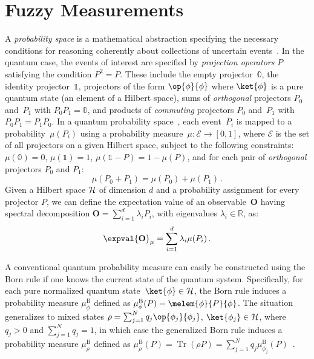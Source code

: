 \documentclass[english,reprint, aps, prl,superscriptaddress, showpacs,
showkeys, longbibliography, amsmath, amssymb, floatfix]{revtex4-1}
\theoremstyle{plain}
\theoremstyle{definition}
\newcommand{\events}{\ensuremath{\mathcal{E}}}
\newcommand{\proj}[1]{\op{#1}{#1}}
\newcommand{\Tr}{\ensuremath{\mathop{\mathrm{Tr}}\nolimits}}
\begin{document}
\section{Fuzzy Measurements}
\label{sec:fuzzy}

A \emph{probability space} is a mathematical abstraction specifying
the necessary conditions for reasoning coherently about collections of
uncertain
events~\cite{Kolmogorov1950,544199,Griffiths2003,Grabisch2016}. In the
quantum case, the events of interest are specified by \emph{projection
  operators} $P$ satisfying the condition $P^2=P$. These include the
empty projector~$\mathbb{0}$, the identity projector~$\mathbb{1}$,
projectors of the form $\proj{\phi}$ where $\ket{\phi}$ is a pure
quantum state (an element of a Hilbert space), sums of
\emph{orthogonal} projectors $P_0$ and~$P_1$ with $P_0P_1=\mathbb{0}$,
and products of \emph{commuting} projectors $P_0$ and~$P_1$ with
$P_0P_1=P_1P_0$. In a quantum probability
space~\cite{10.2307/2308516,gleason1957,Redhead1987-REDINA,Maassen2010},
each event~$P_{i}$ is mapped to a probability~$\mu(P_{i})$ using a
probability measure~$\mu:\events\rightarrow[0,1]$, where $\events$ is
the set of all projectors on a given Hilbert space, subject to the
following constraints: $\mu(\mathbb{0})=0$, $\mu(\mathbb{1})=1$,
$\mu\left(\mathbb{1}-P\right)=1-\mu\left(P\right)$, and for each pair
of \emph{orthogonal} projectors $P_{0}$ and $P_{1}$:
\begin{equation}
{\mu}\left(P_{0}+P_{1}\right)={\mu}\left(P_{0}\right)+{\mu}\left(P_{1}\right)\,.\label{eq:QuantumProbability-Addition}
\end{equation}
Given a Hilbert space ${\cal H}$ of dimension $d$ and a probability assignment
for every projector $P$, we can define the expectation value of an
observable~$\mathbf{O}$ having spectral decomposition
$\mathbf{O}=\sum_{i=1}^{d}\lambda_{i}P_{i}$, with eigenvalues $\lambda_i \in \mathbb{R}$, as:
\begin{equation}
\expval{\mathbf{O}}_{\mu}=\sum_{i=1}^{d}\lambda_{i}\mu(P_{i})\,.\label{eq:quantum-expectation}
\end{equation}

A conventional quantum probability measure can easily be constructed
using the Born rule if one knows the current state of the quantum
system.  Specifically, for each pure normalized quantum
state~$\ket{\phi} \in {\cal H}$, the Born rule induces a probability measure
$\mu_{\phi}^{\mathrm{B}}$ defined as
$\mu_{\phi}^{\mathrm{B}}(P)=\melem{\phi}{P}{\phi}$. The situation
generalizes to mixed states
$\rho = \sum_{j=1}^{N}q_{j}\proj{\phi_{j}}$, $\ket{\phi_j} \in {\cal H}$, where $q_j > 0$ and
$\sum_{j=1}^{N}q_{j}=1$, in which case the generalized Born rule
induces a probability measure $\mu_{\rho}^{\mathrm{B}}$ defined as
$\mu_{\rho}^{\mathrm{B}}\left(P\right) = \Tr\left(\rho P\right) =
\sum_{j=1}^{N}
q_{j}\mu_{\phi_{j}}^{\mathrm{B}}\left(P\right)$~\citep{Born1983,Mermin2007,Jaeger2007}.
\end{document}
